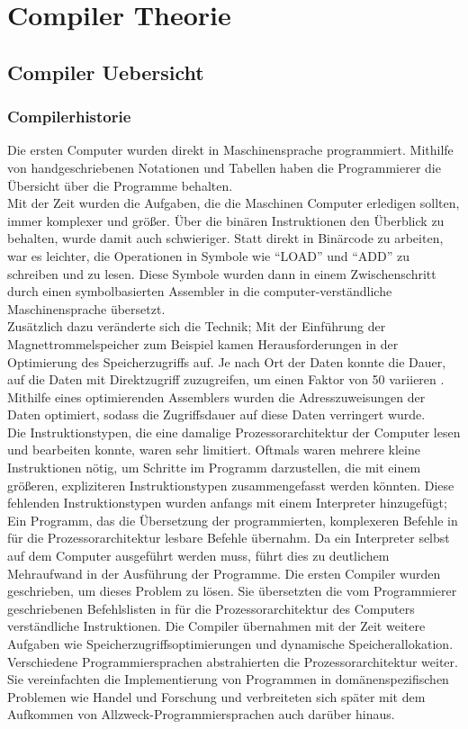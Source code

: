 \part{Compiler Theorie}
\chapter{Compiler Uebersicht}
\label{chap:theory:compilerHistory}

\section{Compilerhistorie}

Die ersten Computer wurden direkt in Maschinensprache programmiert.
Mithilfe von handgeschriebenen Notationen und Tabellen haben die Programmierer die Übersicht über
die Programme behalten.\\
Mit der Zeit wurden die Aufgaben, die die Maschinen Computer erledigen sollten, immer komplexer und größer.
Über die binären Instruktionen den Überblick zu behalten, wurde damit auch schwieriger.
Statt direkt in Binärcode zu arbeiten, war es leichter, die Operationen in Symbole wie ``LOAD'' und ``ADD'' zu schreiben und zu lesen.
Diese Symbole wurden dann in einem Zwischenschritt durch einen symbolbasierten Assembler in die computer-verständliche Maschinensprache übersetzt.\\
Zusätzlich dazu veränderte sich die Technik; 
Mit der Einführung der Magnettrommelspeicher zum Beispiel kamen Herausforderungen in der Optimierung des Speicherzugriffs auf.
Je nach Ort der Daten konnte die Dauer, auf die Daten mit Direktzugriff zuzugreifen, um einen Faktor von 50 variieren \cite{calingaert:1979}.
Mithilfe eines optimierenden Assemblers wurden die Adresszuweisungen der Daten optimiert, sodass die Zugriffsdauer auf diese Daten verringert wurde.\\
Die Instruktionstypen, die eine damalige Prozessorarchitektur der Computer lesen und bearbeiten konnte, waren sehr limitiert.
Oftmals waren mehrere kleine Instruktionen nötig, um Schritte im Programm darzustellen, die mit einem größeren, expliziteren Instruktionstypen
zusammengefasst werden könnten.
Diese fehlenden Instruktionstypen wurden anfangs mit einem Interpreter hinzugefügt; Ein Programm, das die Übersetzung der programmierten, komplexeren Befehle
in für die Prozessorarchitektur lesbare Befehle übernahm.
Da ein Interpreter selbst auf dem Computer ausgeführt werden muss, führt dies zu deutlichem Mehraufwand in der Ausführung der Programme.
Die ersten Compiler wurden geschrieben, um dieses Problem zu lösen.
Sie übersetzten die vom Programmierer geschriebenen Befehlslisten in für die Prozessorarchitektur des Computers verständliche Instruktionen.
Die Compiler übernahmen mit der Zeit weitere Aufgaben wie Speicherzugriffsoptimierungen und dynamische Speicherallokation.
Verschiedene Programmiersprachen abstrahierten die Prozessorarchitektur weiter.
Sie vereinfachten die Implementierung von Programmen in domänenspezifischen Problemen wie Handel und Forschung und verbreiteten sich später mit dem Aufkommen von Allzweck-Programmiersprachen auch darüber hinaus\cite{calingaert:1979}.

